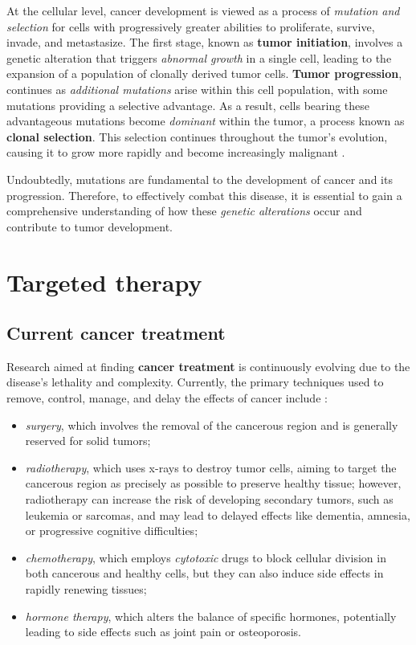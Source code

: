 At the cellular level, cancer development is viewed as a process of \textit{mutation and selection} for cells with progressively greater abilities to proliferate, survive, invade, and metastasize. The first stage, known as \textbf{tumor initiation}, involves a genetic alteration that triggers \textit{abnormal growth} in a single cell, leading to the expansion of a population of clonally derived tumor cells. \textbf{Tumor progression}, continues as \textit{additional mutations} arise within this cell population, with some mutations providing a selective advantage. As a result, cells bearing these advantageous mutations become \textit{dominant} within the tumor, a process known as \textbf{clonal selection}. This selection continues throughout the tumor's evolution, causing it to grow more rapidly and become increasingly malignant \cite{nih_cancer_dev}.

Undoubtedly, mutations are fundamental to the development of cancer and its progression. Therefore, to effectively combat this disease, it is essential to gain a comprehensive understanding of how these \textit{genetic alterations} occur and contribute to tumor development.

\section{Targeted therapy}

\subsection{Current cancer treatment}

Research aimed at finding \textbf{cancer treatment} is continuously evolving due to the disease's lethality and complexity. Currently, the primary techniques used to remove, control, manage, and delay the effects of cancer include \cite{cancer_treat}:

\begin{itemize}
    \item \textit{surgery}, which involves the removal of the cancerous region and is generally reserved for solid tumors;
    \item \textit{radiotherapy}, which uses x-rays to destroy tumor cells, aiming to target the cancerous region as precisely as possible to preserve healthy tissue; however, radiotherapy can increase the risk of developing secondary tumors, such as leukemia or sarcomas, and may lead to delayed effects like dementia, amnesia, or progressive cognitive difficulties;
    \item \textit{chemotherapy}, which employs \textit{cytotoxic} drugs to block cellular division in both cancerous and healthy cells, but they can also induce side effects in rapidly renewing tissues;
    \item \textit{hormone therapy}, which alters the balance of specific hormones, potentially leading to side effects such as joint pain or osteoporosis.
\end{itemize}

